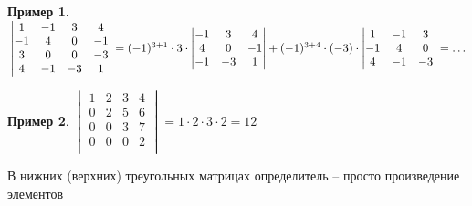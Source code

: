 \documentclass{book}
\theoremstyle{definition}
\newtheorem*{example}{Пример}
\begin{document}
    \begin{example}
        $ \\ 
        \begin{vmatrix}
            1 & -1 & 3 & 4\\ -1 & 4 & 0 & -1\\ 3 & 0 & 0 & -3\\ 4 & -1 & -3 & 1\\ 
        \end{vmatrix} = (-1)^{3+1} \cdot  3 \cdot  
        \begin{vmatrix}
            -1 & 3 & 4\\ 4 & 0 & -1\\ -1 & -3 & 1
        \end{vmatrix} + (-1)^{3+4} \cdot  (-3) \cdot  
        \begin{vmatrix}
            1 & -1 & 3\\
            -1 & 4 & 0\\
            4 & -1 & -3\\
        \end{vmatrix} = \ldots$
    \end{example}

    \begin{example}
        $\begin{vmatrix} 1 & 2 & 3 & 4\\ 0 & 2 & 5 & 6 \\ 0 & 0 & 3 & 7\\ 0 & 0 & 0 & 2\\ \end{vmatrix}  = 1\cdot 2\cdot 3\cdot 2 = 12$

        В нижних (верхних) треугольных матрицах определитель -- просто произведение элементов
    \end{example}
\end{document}
